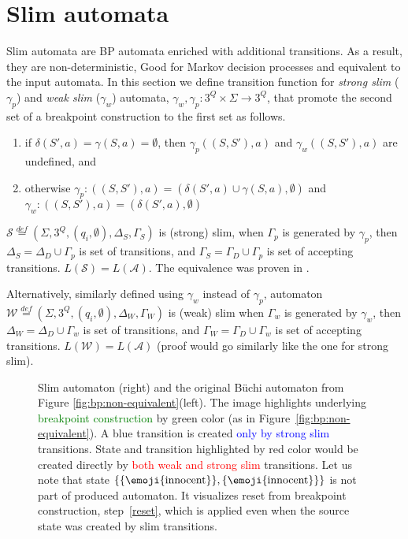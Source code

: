 \documentclass[
	digital,
nolof, nolot
]{fithesis3}
\newcommand{\cA}{\mathcal{A}}
\newcommand{\cS}{\mathcal{S}}
\newcommand{\lA}{L(\cA)}
\newcommand{\lS}{L(\cS)}
\newcommand{\eqdef}{\overset{def}{=}}
\newcommand{\heaven}{\text{\emoji{innocent}}}
\begin{document}
			\section{Slim automata}\label{section:slim}
			Slim automata are BP automata enriched with additional transitions. As a result, they are non-deterministic, Good for Markov decision processes \cite{hlavni} and equivalent to the input automata.	
			In this section we define transition function for \emph{strong slim} ($\gamma_{p}$)\cite{hlavni} and \emph{weak slim} ($\gamma_{w}$) automata,
			 $\gamma_w, \gamma_p:3^Q \times \Sigma \rightarrow 3^Q$, that promote the second set of a breakpoint construction to the first set as follows. 
			
			\begin{enumerate}
				\item if $\delta(S',a) = \gamma(S, a) = \emptyset$, then $\gamma_{p}((S,S'), a)$ and $\gamma_{w}((S,S'), a)$ are undefined, and
				\item otherwise
				$\gamma_{p}:((S,S'),a)=(\delta(S',a)\cup\gamma(S, a),\emptyset)$ and $\gamma_{w}:((S,S'),a)=(\delta(S',a),\emptyset)$
			\end{enumerate}
			
			
			$\cS\eqdef(\Sigma, 3^Q, (q_i,\emptyset), \Delta_S ,\Gamma_S)$ is (strong) slim, when  $\Gamma_p$ is generated by $\gamma_p$, then 
			$\Delta_S=\Delta_D \cup \Gamma_p$ is set of transitions, and
			$\Gamma_S=\Gamma_D \cup \Gamma_p$ is set of accepting transitions. $\lS = \lA$. The equivalence was proven in \cite{hlavni}.
			
			Alternatively, similarly defined using $\gamma_w$ instead of $\gamma_{p}$, automaton $\mathcal{W}\eqdef(\Sigma, 3^Q, (q_i,\emptyset), \Delta_W, \Gamma_W)$ is (weak) slim  when $\Gamma_w$ is generated by $\gamma_w$, then 
			$\Delta_W=\Delta_D \cup \Gamma_w$ is set of transitions, and
			$\Gamma_W=\Gamma_D \cup \Gamma_w$ is set of accepting transitions. $L(\mathcal{W}) = \lA$  (proof would go similarly like the one for strong slim).
			
			\begin{figure}[ht]
				\begin{center}
				
				\end{center}
				\caption{Slim automaton (right) and the original Büchi automaton from Figure \ref{fig:bp:non-equivalent}(left).  The image highlights underlying \textcolor{green}{breakpoint construction} by green color (as in Figure~\ref{fig:bp:non-equivalent}). A blue transition is created \textcolor{blue}{only by strong slim} transitions. State and transition  highlighted by red color would be created directly by \textcolor{red}{both weak and strong slim} transitions.  Let us note that state $\{\{\heaven\},\{\heaven\}\}$ is not part of produced automaton. It visualizes reset from breakpoint construction, step~\ref{reset}, which is applied even when the source state was created by slim transitions. }
				\label{fig:slim:equivalent}
			\end{figure}
\end{document}
